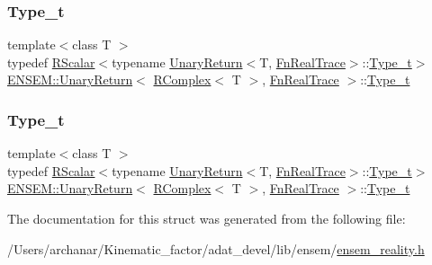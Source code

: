 \subsubsection{\texorpdfstring{Type\_t}{Type\_t}\hspace{0.1cm}{\footnotesize\ttfamily [1/2]}}
{\footnotesize\ttfamily template$<$class T $>$ \\
typedef \mbox{\hyperlink{classENSEM_1_1RScalar}{R\+Scalar}}$<$typename \mbox{\hyperlink{structENSEM_1_1UnaryReturn}{Unary\+Return}}$<$T, \mbox{\hyperlink{structENSEM_1_1FnRealTrace}{Fn\+Real\+Trace}}$>$\+::\mbox{\hyperlink{structENSEM_1_1UnaryReturn_3_01RComplex_3_01T_01_4_00_01FnRealTrace_01_4_abd4db6ffb0c49832943fdeb34185ec21}{Type\+\_\+t}}$>$ \mbox{\hyperlink{structENSEM_1_1UnaryReturn}{E\+N\+S\+E\+M\+::\+Unary\+Return}}$<$ \mbox{\hyperlink{classENSEM_1_1RComplex}{R\+Complex}}$<$ T $>$, \mbox{\hyperlink{structENSEM_1_1FnRealTrace}{Fn\+Real\+Trace}} $>$\+::\mbox{\hyperlink{structENSEM_1_1UnaryReturn_3_01RComplex_3_01T_01_4_00_01FnRealTrace_01_4_abd4db6ffb0c49832943fdeb34185ec21}{Type\+\_\+t}}}

\mbox{\label{structENSEM_1_1UnaryReturn_3_01RComplex_3_01T_01_4_00_01FnRealTrace_01_4_abd4db6ffb0c49832943fdeb34185ec21}} 
\subsubsection{\texorpdfstring{Type\_t}{Type\_t}\hspace{0.1cm}{\footnotesize\ttfamily [2/2]}}
{\footnotesize\ttfamily template$<$class T $>$ \\
typedef \mbox{\hyperlink{classENSEM_1_1RScalar}{R\+Scalar}}$<$typename \mbox{\hyperlink{structENSEM_1_1UnaryReturn}{Unary\+Return}}$<$T, \mbox{\hyperlink{structENSEM_1_1FnRealTrace}{Fn\+Real\+Trace}}$>$\+::\mbox{\hyperlink{structENSEM_1_1UnaryReturn_3_01RComplex_3_01T_01_4_00_01FnRealTrace_01_4_abd4db6ffb0c49832943fdeb34185ec21}{Type\+\_\+t}}$>$ \mbox{\hyperlink{structENSEM_1_1UnaryReturn}{E\+N\+S\+E\+M\+::\+Unary\+Return}}$<$ \mbox{\hyperlink{classENSEM_1_1RComplex}{R\+Complex}}$<$ T $>$, \mbox{\hyperlink{structENSEM_1_1FnRealTrace}{Fn\+Real\+Trace}} $>$\+::\mbox{\hyperlink{structENSEM_1_1UnaryReturn_3_01RComplex_3_01T_01_4_00_01FnRealTrace_01_4_abd4db6ffb0c49832943fdeb34185ec21}{Type\+\_\+t}}}



The documentation for this struct was generated from the following file\+:\begin{DoxyCompactItemize}
\item 
/\+Users/archanar/\+Kinematic\+\_\+factor/adat\+\_\+devel/lib/ensem/\mbox{\hyperlink{lib_2ensem_2ensem__reality_8h}{ensem\+\_\+reality.\+h}}\end{DoxyCompactItemize}
